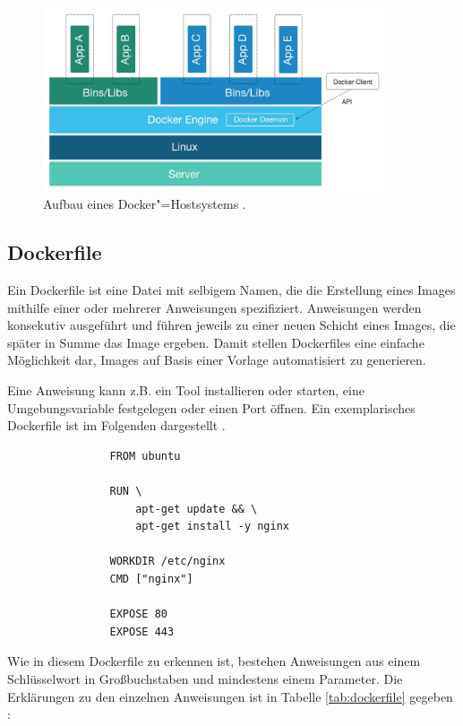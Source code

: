\documentclass[../main.tex]{subfiles}
\begin{document}
      \begin{figure}[h]
          \centering
          \includegraphics[width=0.9\textwidth]{./images/intro_dockerHost.jpg}
          \caption{Aufbau eines Docker"=Hostsystems \cite[S.3]{dockerSecIntro}.}
          \label{fig:intro_dockerHost}
      \end{figure}

		\subsection{Dockerfile}
		\label{dockerDockerfile}
      Ein Dockerfile ist eine Datei mit selbigem Namen, die die Erstellung eines Images mithilfe einer oder mehrerer Anweisungen spezifiziert. Anweisungen werden konsekutiv ausgeführt und führen jeweils zu einer neuen Schicht eines Images, die später in Summe das Image ergeben. Damit stellen Dockerfiles eine einfache Möglichkeit dar, Images auf Basis einer Vorlage automatisiert zu generieren.

			Eine Anweisung kann z.B. ein Tool installieren oder starten, eine Umgebungsvariable festgelegen oder einen Port öffnen. Ein exemplarisches Dockerfile ist im Folgenden dargestellt \cite{githubDockerfileNginx}.

			\begin{lstlisting}
				FROM ubuntu

				RUN \
					apt-get update && \
					apt-get install -y nginx

				WORKDIR /etc/nginx
				CMD ["nginx"]

				EXPOSE 80
				EXPOSE 443
			\end{lstlisting}

			Wie in diesem Dockerfile zu erkennen ist, bestehen Anweisungen aus einem Schlüsselwort in Großbuchstaben und mindestens einem Parameter. Die Erklärungen zu den einzelnen Anweisungen ist in Tabelle \ref{tab:dockerfile} gegeben \cite{dockerDockerfileDocs}:
\end{document}
